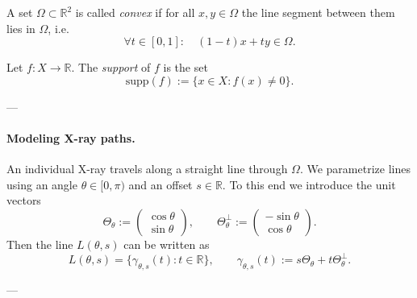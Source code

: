 \documentclass[12pt,a4paper]{article}
\begin{document}
\begin{definition}
A set $\Omega \subset \mathbb{R}^2$ is called \emph{convex} if for all $x,y \in \Omega$ the line segment between them lies in $\Omega$, i.e.
\[
\forall t \in [0,1]: \quad (1-t)x + ty \in \Omega.
\]
\end{definition}

\begin{definition}
Let $f : X \to \mathbb{R}$. The \emph{support} of $f$ is the set
\[
\mathrm{supp}(f) := \{ x \in X : f(x) \neq 0 \}.
\]
\end{definition}

---

\paragraph{Modeling X-ray paths.}
An individual X-ray travels along a straight line through $\Omega$. We parametrize lines using an angle $\theta \in [0,\pi)$ and an offset $s \in \mathbb{R}$. To this end we introduce the unit vectors
\[
\Theta_\theta := \begin{pmatrix} \cos \theta \\ \sin \theta \end{pmatrix},
\qquad
\Theta_\theta^\perp := \begin{pmatrix} -\sin \theta \\ \cos \theta \end{pmatrix}.
\]
Then the line $L(\theta,s)$ can be written as
\begin{equation}
L(\theta,s) = \{ \gamma_{\theta,s}(t) : t \in \mathbb{R} \},
\qquad
\gamma_{\theta,s}(t) := s \Theta_\theta + t \Theta_\theta^\perp.
\label{eq:line_param}
\end{equation}

---
\end{document}
